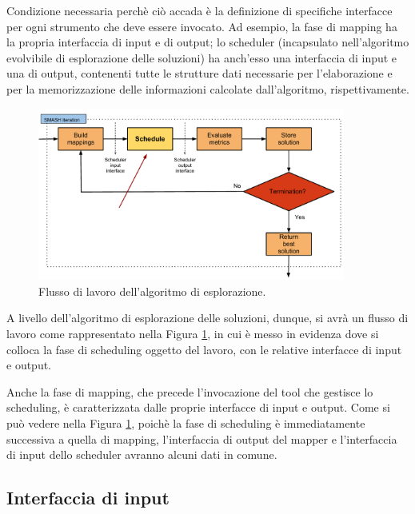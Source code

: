 Condizione necessaria perchè ciò accada è la definizione di specifiche 
interfacce per ogni strumento che deve essere invocato. Ad esempio, la fase di 
mapping ha la propria interfaccia di input e di output; lo scheduler 
(incapsulato nell'algoritmo evolvibile di esplorazione delle soluzioni) ha 
anch'esso una interfaccia di input e una di output, contenenti tutte 
le strutture dati necessarie per l'elaborazione e per la memorizzazione delle 
informazioni calcolate dall'algoritmo, rispettivamente. 

\begin{figure}
 \begin{center}
  \includegraphics[width=0.9\textwidth]{capitoli/figure/cap3/MapperWorkflow.pdf}
  \caption{Flusso di lavoro dell'algoritmo di esplorazione.}
  \label{fig:mapperWorkflow}
 \end{center}
\end{figure}

A livello dell'algoritmo di esplorazione delle soluzioni, dunque, si avrà un 
flusso di lavoro come rappresentato nella Figura \ref{fig:mapperWorkflow}, in 
cui è messo in evidenza dove si colloca la fase di scheduling oggetto del 
lavoro, con le relative interfacce di input e output.

Anche la fase di mapping, che precede l'invocazione del tool che gestisce lo 
scheduling, è caratterizzata dalle proprie interfacce di input e output. Come 
si può vedere nella Figura \ref{fig:mapperWorkflow}, poichè la fase di 
scheduling è immediatamente successiva a quella di mapping, l'interfaccia di 
output del mapper e l'interfaccia di input dello scheduler avranno alcuni dati 
in comune.


\subsection{Interfaccia di input}

